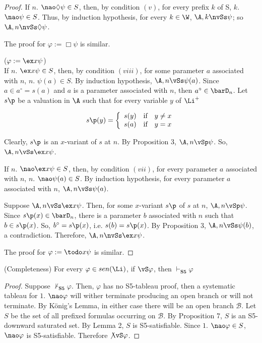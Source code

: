 \begin{proof}
\qquad If $n.$ $\nao\Diamond\psi \in S$, then, by condition $(v)$, for every prefix $k$ of S, $k.$ $\nao \psi \in S$. Thus, by induction hypothesis, for every $k \in \W$, $\A,k \nvSs \psi$; so $\A,n \nvSs \Diamond \psi$.  
\vspace{10mm}


\qquad The proof for $\varphi := \Box\psi$ is similar.
\vspace{10mm}



($\varphi := \ex x \psi$)\\
\qquad If $n.$ $\ex x \psi \in S$, then, by condition $(viii)$, for some parameter $a$ associated with $n$, $n.$ $\psi(a) \in S$. By induction hypothesis, $\A,n \vSs \psi(a)$. Since $a \in a^{\circ} = s(a)$ and $a$ is a parameter associated with $n$, then $a^{\circ} \in \barD_{n}$. Let $s\p$ be a valuation in $\A$ such that for every variable $y$ of $\Li^{+}$
  
$$
s\p(y) = \left\{
\begin{array}{rcl}
s(y) & \mbox{if} & y \neq x\\
s(a) & \mbox{if} & y = x\\
\end{array}
\right.
$$
    
\qquad Clearly, $s\p$ is an $x$-variant of $s$ at $n$. By Proposition 3, $\A,n \vSp \psi$. So, $\A,n \vSs \ex x\psi$.      

\qquad If $n.$ $\nao\ex x \psi\in S$, then, by condition $(vii)$, for every parameter $a$ associated with $n$, $n.$ $\nao \psi(a) \in S$. By induction hypothesis, for every parameter $a$ associated with $n$, $\A,n \vSs \psi(a)$.

\qquad Suppose $\A,n \vSs \ex x \psi$. Then, for some $x$-variant $s\p$ of $s$ at $n$, $\A,n \vSp \psi$. Since $s\p(x) \in \barD_{n}$, there is a parameter $b$ associated with $n$ such that $b \in s\p(x)$. So, $b^{\circ} = s\p(x)$, i.e. $s(b)= s\p(x)$. By Proposition 3, $\A,n \vSs \psi(b)$, a contradiction. Therefore, $\A,n \nvSs \ex x \psi$.    
\vspace{10mm}

\qquad The proof for $\varphi := \todo x\psi$ is similar.
\end{proof}

\begin{teor}
(Completeness) For every $\varphi \in sen(\Li)$, if $\vS\varphi$, then $\vdash_{\textbf{S5}} \varphi$
\end{teor}

\begin{proof}
Suppose $\not\vdash_{\textbf{S5}} \varphi$. Then, $\varphi$ has no S5-tableau proof, then a systematic tableau for $1.$  $\nao \varphi$ will wither terminate producing an open branch or will not terminate. By K\"onig's Lemma, in either case there will be an open branch $\mathcal{B}$. Let $S$ be the set of all prefixed formulas occurring on $\mathcal{B}$. By Proposition 7, $S$ is an S5-downward saturated set. By Lemma 2, $S$ is S5-satisfiable. Since $1.$ $\nao \varphi \in S$, $\nao \varphi$ is S5-satisfiable. Therefore $\not\vS\varphi$.
\end{proof}


